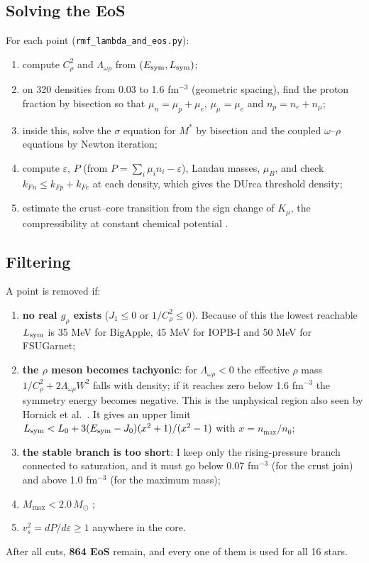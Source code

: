 \documentclass[11pt,a4paper]{article}
\newcommand{\Esym}{E_{\rm sym}}
\newcommand{\Lsym}{L_{\rm sym}}
\newcommand{\Msun}{M_\odot}
\begin{document}
\subsection{Solving the EoS}
For each point (\texttt{rmf\_lambda\_and\_eos.py}):
\begin{enumerate}
\item compute $C_\rho^2$ and $\Lambda_{\omega\rho}$ from $(\Esym,\Lsym)$;
\item on 320 densities from 0.03 to 1.6 fm$^{-3}$ (geometric spacing), find the proton fraction by bisection so that $\mu_n=\mu_p+\mu_e$, $\mu_\mu=\mu_e$ and $n_p=n_e+n_\mu$;
\item inside this, solve the $\sigma$ equation for $M^*$ by bisection and the coupled $\omega$--$\rho$ equations by Newton iteration;
\item compute $\varepsilon$, $P$ (from $P=\sum_i\mu_in_i-\varepsilon$), Landau masses, $\mu_B$, and check $k_{Fn}\le k_{Fp}+k_{Fe}$ at each density, which gives the DUrca threshold density;
\item estimate the crust--core transition from the sign change of $K_\mu$, the compressibility at constant chemical potential \cite{LattimerPrakash2007}.
\end{enumerate}

\subsection{Filtering}
A point is removed if:
\begin{enumerate}
\item \textbf{no real $g_\rho$ exists} ($J_1\le0$ or $1/C_\rho^2\le0$). Because of this the lowest reachable $\Lsym$ is 35 MeV for BigApple, 45 MeV for IOPB-I and 50 MeV for FSUGarnet;
\item \textbf{the $\rho$ meson becomes tachyonic}: for $\Lambda_{\omega\rho}<0$ the effective $\rho$ mass $1/C_\rho^2+2\Lambda_{\omega\rho}W^2$ falls with density; if it reaches zero below 1.6 fm$^{-3}$ the symmetry energy becomes negative. This is the unphysical region also seen by Hornick et al.\ \cite{Hornick2018}. It gives an upper limit $\Lsym< L_0+3(\Esym-J_0)(x^2+1)/(x^2-1)$ with $x=n_{\max}/n_0$;
\item \textbf{the stable branch is too short}: I keep only the rising-pressure branch connected to saturation, and it must go below 0.07 fm$^{-3}$ (for the crust join) and above 1.0 fm$^{-3}$ (for the maximum mass);
\item $M_{\max}<2.0\,\Msun$ \cite{Demorest2010,Antoniadis2013,Fonseca2021};
\item $v_s^2=dP/d\varepsilon\ge1$ anywhere in the core.
\end{enumerate}
After all cuts, \textbf{864 EoS} remain, and every one of them is used for all 16 stars.
\end{document}
